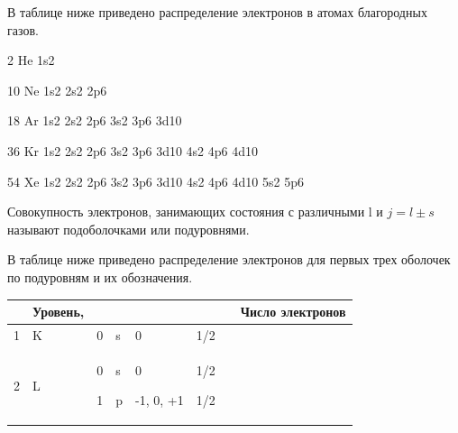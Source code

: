 \documentclass[a4paper,14pt, openany, twoside, draft]{extbook} %
\begin{document}
В таблице ниже приведено распределение электронов в атомах благородных газов.

 2 He  1s2

10 Ne  1s2  2s2  2p6

18 Ar  1s2  2s2  2p6  3s2  3p6  3d10

36 Kr  1s2  2s2  2p6  3s2  3p6  3d10  4s2 4p6  4d10

54 Xe  1s2  2s2  2p6  3s2  3p6  3d10  4s2 4p6  4d10  5s2  5p6

Совокупность электронов, занимающих состояния с различными l и   $j=l\pm s$ называют подоболочками или подуровнями.

В таблице ниже приведено распределение электронов для первых трех оболочек по подуровням и их обозначения.

\begin{flushleft}
\tablefirsthead{}
\tablehead{}
\tabletail{}
\tablelasttail{}
\begin{supertabular}{|m{0.7cm}|m{1.9449999cm}|m{0.68cm}|m{1.726cm}|m{2.892cm}|m{1.04cm}|m{1.8499999cm}|m{2.504cm}|}
\hline
{} &
{\centering{} Уровень,\par}

 &
 &
 &
 &
 &
 &
{\centering{} Число электронов\par}

{}\\\hline
{ 1} &
{ K} &
{ 0} &
{ s} &
{ 0} &
{ 1/2 } &
{} &
{}\\\hline
{ 2} &
{ L} &
{ 0}

{ 1} &
{ s}

{ p} &
{ 0}

{ {}-1, 0, +1} &
{ 1/2 }

{ 1/2}


\end{supertabular}
\end{flushleft}
\end{document}
